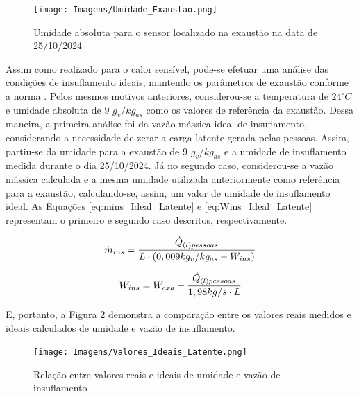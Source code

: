 \documentclass[acronym,symbols,table]{fei}
\begin{document}
\begin{figure}[!htb]
    \centering
    \caption{Umidade absoluta para o sensor localizado na exaustão na data de 25/10/2024}
    \texttt{[image: Imagens/Umidade\_Exaustao.png]}
    \label{fig:Umidade_Exaustao}
\end{figure}

Assim como realizado para o calor sensível, pode-se efetuar uma análise das condições de insuflamento ideais, mantendo os parâmetros de exaustão conforme a norma \textcite{abnt216401}. Pelos mesmos motivos anteriores, considerou-se a temperatura de $24^\circ C$ e umidade absoluta de $9$ $g_{v}/kg_{as}$ como os valores de referência da exaustão. Dessa maneira, a primeira análise foi da vazão mássica ideal de insuflamento, considerando a necessidade de zerar a carga latente gerada pelas pessoas. Assim, partiu-se da umidade para a exaustão de $9$ $g_{v}/kg_{as}$ e a umidade de insuflamento medida durante o dia 25/10/2024. Já no segundo caso, considerou-se a vazão mássica calculada e a mesma umidade utilizada anteriormente como referência para a exaustão, calculando-se, assim, um valor de umidade de insuflamento ideal. As Equações \ref{eq:mins_Ideal_Latente} e \ref{eq:Wins_Ideal_Latente} representam o primeiro e segundo caso descritos, respectivamente.

\begin{equation} \label{eq:mins_Ideal_Latente}
    \begin{aligned}
    \dot{m}_{ins}=\frac{\dot{Q}_{(l)pessoas}}{L \cdot (0,009 \space kg_{v}/kg_{as} - W_{ins})}
    \end{aligned}
\end{equation}

\begin{equation} \label{eq:Wins_Ideal_Latente}
    \begin{aligned}
    W_{ins}=W_{exa} - \frac{\dot{Q}_{(l)pessoas}}{1,98 \space kg/s \cdot L}
    \end{aligned}
\end{equation}

E, portanto, a Figura \ref{fig:Valores_Ideais_Latente} demonstra a comparação entre os valores reais medidos e ideais calculados de umidade e vazão de insuflamento.

\begin{figure}[!htb]
    \centering
    \caption{Relação entre valores reais e ideais de umidade e vazão de insuflamento}
    \texttt{[image: Imagens/Valores\_Ideais\_Latente.png]}
    \label{fig:Valores_Ideais_Latente}
\end{figure}
\end{document}

